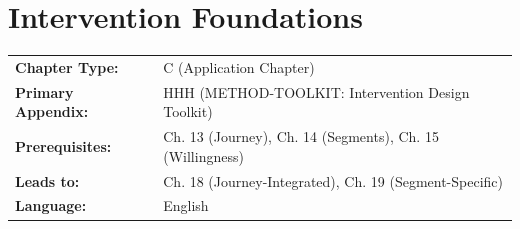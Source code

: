 %
%

\chapter{Intervention Foundations}
\label{ch:intervention-foundations}


\begin{tcolorbox}[colback=gray!5!white, colframe=gray!75!black, title=Chapter Metadata]
\small
\begin{tabular}{@{}ll@{}}
\textbf{Chapter Type:} & C (Application Chapter) \\
\textbf{Primary Appendix:} & HHH (METHOD-TOOLKIT: Intervention Design Toolkit) \\
\textbf{Prerequisites:} & Ch. 13 (Journey), Ch. 14 (Segments), Ch. 15 (Willingness) \\
\textbf{Leads to:} & Ch. 18 (Journey-Integrated), Ch. 19 (Segment-Specific) \\
\textbf{Language:} & English \\
\end{tabular}
\end{tcolorbox}


